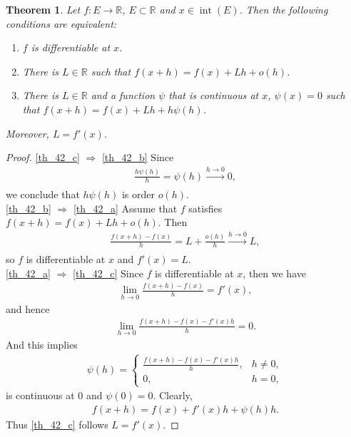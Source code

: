 \documentclass[10pt]{book}
\newtheorem{theorem}{Theorem}[chapter]
\theoremstyle{definition}
\numberwithin{equation}{chapter}
\begin{document}
\begin{theorem}\label{th_42}
Let $f: E \to \mathbb{R}$, $E \subset \mathbb{R}$ and $x \in  \operatorname{int}(E)$. Then the following conditions are equivalent:
\begin{enumerate}[label=(\alph*)]
    \item $f$ is differentiable at $x$. \label{th_42_a}
    
    \item There is $L \in \mathbb{R}$ such that $f(x+h) = f(x) + Lh + o(h)$. \label{th_42_b}
    
    \item There is $L \in \mathbb{R}$ and a function $\psi$ that is continuous at $x$, $\psi(x) = 0$ such that $f(x+h) = f(x) + Lh + h\psi(h)$. \label{th_42_c}
\end{enumerate}
Moreover, $L = f'(x)$.
\end{theorem}
\begin{proof}
\ref{th_42_c} $\Rightarrow$ \ref{th_42_b} Since 
\begin{align*}
    \frac{h \psi(h)}{h} = \psi(h) \xrightarrow[]{h \to 0} 0,
\end{align*}
we conclude that $h\psi(h)$ is order $o(h)$.\\
\ref{th_42_b} $\Rightarrow$ \ref{th_42_a} Assume that $f$ satisfies $f(x+h) = f(x) + Lh + o(h)$. Then 
\begin{align*}
    \frac{f(x+h) - f(x)}{h} = L + \frac{o(h)}{h} \xrightarrow[]{h \to 0} L,
\end{align*}
so $f$ is differentiable at $x$ and $f'(x) = L$.\\
\ref{th_42_a} $\Rightarrow$ \ref{th_42_c} Since $f$ is differentiable at $x$, then we have
\begin{align*}
    \lim_{h\to 0} \frac{f(x+h) - f(x)}{h} = f'(x),
\end{align*}
and hence
\begin{align*}
    \lim_{h\to 0} \frac{f(x+h) - f(x) - f'(x)h}{h} = 0.
\end{align*}
And this implies
\begin{align*}
    \psi(h) = \begin{cases}
        \frac{f(x+h) - f(x) - f'(x)h}{h}, & h \neq 0, \\
        0, & h = 0,
    \end{cases}
\end{align*}
is continuous at $0$ and $\psi(0) = 0$. Clearly,
\begin{align*}
    f(x+h) = f(x) + f'(x)h + \psi(h) h.
\end{align*}
Thus \ref{th_42_c} follows $L = f'(x)$.
\end{proof}
\end{document}
